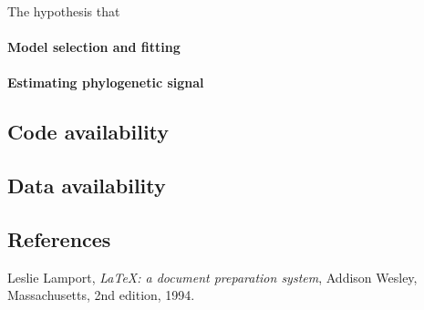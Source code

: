 \documentclass[twocolumn, linenumbers, superscriptaddress]{revtex4-1}
\begin{document}
				The hypothesis that 
			
 
			\paragraph*{Model selection and fitting}
			
			\paragraph*{Estimating phylogenetic signal}
		
			
		\subsection*{Code availability}
			
		\subsection*{Data availability}

	\begin{thebibliography}{50}
		\section*{References}	
				Leslie Lamport,
				\textit{\LaTeX: a document preparation system},
				Addison Wesley, Massachusetts,
				2nd edition,
				1994.

	\end{thebibliography}
\end{document}
